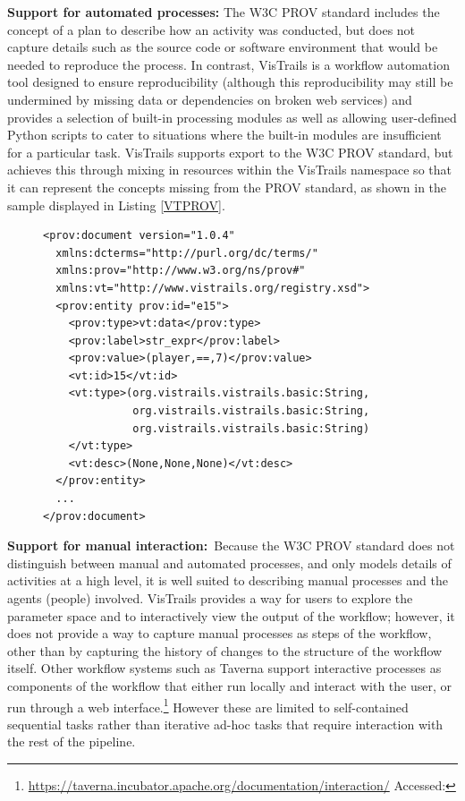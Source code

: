 \textbf{Support for automated processes:} The W3C PROV standard includes the
concept of a plan to describe how an activity was conducted, but does
not capture details such as the source code or software environment that
would be needed to reproduce the process. In contrast, VisTrails is a
workflow automation tool designed to ensure reproducibility (although
this reproducibility may still be undermined by missing data or
dependencies on broken web services) and provides a selection of
built-in processing modules as well as allowing user-defined Python
scripts to cater to situations where the built-in modules are
insufficient for a particular task. VisTrails supports export to the W3C
PROV standard, but achieves this through mixing in resources within the
VisTrails namespace so that it can represent the concepts missing from
the PROV standard, as shown in the sample displayed in Listing
\ref{VTPROV}.

\begin{figure}[h] %
\begin{lstlisting}[frame=single, basicstyle=\small, caption={Sample of PROV export generated
by VisTrails. Note that it mixes resources in the Vistrails ``vt:'' namespace with the
W3C ``prov:'' namespace to make capturing the workflow possible.}, label=VTPROV]
<prov:document version="1.0.4"
  xmlns:dcterms="http://purl.org/dc/terms/"
  xmlns:prov="http://www.w3.org/ns/prov#"
  xmlns:vt="http://www.vistrails.org/registry.xsd">
  <prov:entity prov:id="e15">
    <prov:type>vt:data</prov:type>
    <prov:label>str_expr</prov:label>
    <prov:value>(player,==,7)</prov:value>
    <vt:id>15</vt:id>
    <vt:type>(org.vistrails.vistrails.basic:String,
              org.vistrails.vistrails.basic:String,
              org.vistrails.vistrails.basic:String)
    </vt:type>
    <vt:desc>(None,None,None)</vt:desc>
  </prov:entity>
  ...
</prov:document>
\end{lstlisting}
\end{figure}

{
\textbf{Support for manual interaction:}{~Because the W3C PROV standard does
not distinguish between manual and automated processes, and only
models details of activities at a high level, it is well suited to
describing manual processes and the agents (people) involved. VisTrails
provides a way for users to explore the parameter space and to
interactively view the output of the workflow; however, it does not provide
a way to capture manual processes as steps of the workflow, other than
by capturing the history of changes to the structure of the workflow
itself. Other workflow systems such as Taverna support interactive
processes as components of the workflow that either run locally and
interact with the user, or run through a web interface.\footnote{\url{https://taverna.incubator.apache.org/documentation/interaction/} Accessed: } However these are limited to
self-contained sequential tasks rather than iterative ad-hoc tasks that
require interaction with the rest of the pipeline.}
}

